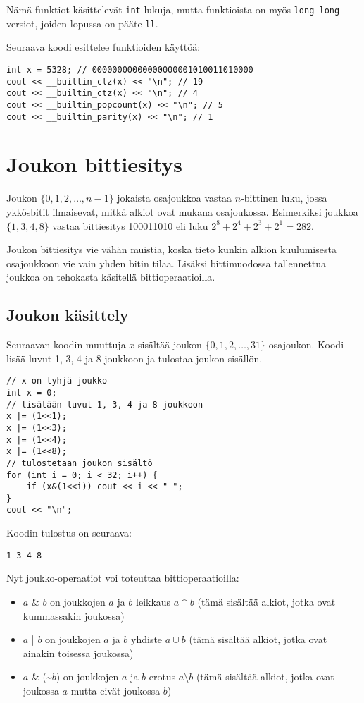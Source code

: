 \begin{samepage}
\noindent
Nämä funktiot käsittelevät \texttt{int}-lukuja,
mutta funktioista on myös \texttt{long long} -versiot,
joiden lopussa on pääte \texttt{ll}.

Seuraava koodi esittelee funktioiden käyttöä:

\begin{lstlisting}
int x = 5328; // 00000000000000000001010011010000
cout << __builtin_clz(x) << "\n"; // 19
cout << __builtin_ctz(x) << "\n"; // 4
cout << __builtin_popcount(x) << "\n"; // 5
cout << __builtin_parity(x) << "\n"; // 1
\end{lstlisting}
\end{samepage}

\section{Joukon bittiesitys}

Joukon $\{0,1,2,\ldots,n-1\}$
jokaista osajoukkoa
vastaa $n$-bittinen luku,
jossa ykkösbitit ilmaisevat,
mitkä alkiot ovat mukana osajoukossa.
Esimerkiksi joukkoa $\{1,3,4,8\}$
vastaa bittiesitys 100011010 eli luku
$2^8+2^4+2^3+2^1=282$.

Joukon bittiesitys vie vähän muistia,
koska tieto kunkin alkion kuulumisesta
osajoukkoon vie vain yhden bitin tilaa.
Lisäksi bittimuodossa tallennettua joukkoa
on tehokasta käsitellä bittioperaatioilla.

\subsection{Joukon käsittely}

Seuraavan koodin muuttuja $x$
sisältää joukon $\{0,1,2,\ldots,31\}$
osajoukon.
Koodi lisää luvut 1, 3, 4 ja 8
joukkoon ja tulostaa
joukon sisällön.

\begin{lstlisting}
// x on tyhjä joukko
int x = 0;
// lisätään luvut 1, 3, 4 ja 8 joukkoon
x |= (1<<1);
x |= (1<<3);
x |= (1<<4);
x |= (1<<8);
// tulostetaan joukon sisältö
for (int i = 0; i < 32; i++) {
    if (x&(1<<i)) cout << i << " ";
}
cout << "\n";
\end{lstlisting}
Koodin tulostus on seuraava:
\begin{lstlisting}
1 3 4 8
\end{lstlisting}

\noindent
Nyt joukko-operaatiot voi toteuttaa bittioperaatioilla:
\begin{itemize}
\item $a$ \& $b$ on joukkojen $a$ ja $b$ leikkaus $a \cap b$
(tämä sisältää alkiot,
jotka ovat kummassakin joukossa)
\item $a$ | $b$ on joukkojen $a$ ja $b$ yhdiste $a \cup b$
(tämä sisältää alkiot,
jotka ovat ainakin toisessa joukossa)
\item $a$ \& (\textasciitilde$b$) on joukkojen $a$ ja $b$ erotus
$a \setminus b$ (tämä sisältää alkiot,
jotka ovat joukossa $a$ mutta eivät joukossa $b$)
\end{itemize}

